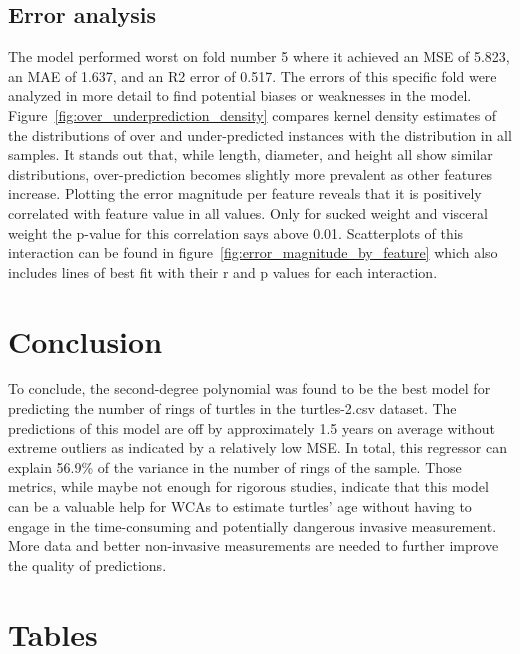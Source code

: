\documentclass[twocolumn]{article}
\begin{document}
\subsection{Error analysis}
The model performed worst on fold number 5 where it achieved an MSE of 5.823, an MAE of 1.637, and an R2 error of 0.517. The errors of this specific fold were analyzed in more detail to find potential biases or weaknesses in the model. Figure~\ref{fig:over_underprediction_density} compares kernel density estimates of the distributions of over and under-predicted instances with the distribution in all samples. It stands out that, while length, diameter, and height all show similar distributions, over-prediction becomes slightly more prevalent as other features increase.
Plotting the error magnitude per feature reveals that it is positively correlated with feature value in all values. Only for sucked weight and visceral weight the p-value for this correlation says above 0.01. Scatterplots of this interaction can be found in figure~\ref{fig:error_magnitude_by_feature} which also includes lines of best fit with their r and p values for each interaction.


\section{Conclusion}

To conclude, the second-degree polynomial was found to be the best model for predicting the number of rings of turtles in the turtles-2.csv dataset. The predictions of this model are off by approximately 1.5 years on average without extreme outliers as indicated by a relatively low MSE. In total, this regressor can explain 56.9\% of the variance in the number of rings of the sample. Those metrics, while maybe not enough for rigorous studies, indicate that this model can be a valuable help for WCAs to estimate turtles' age without having to engage in the time-consuming and potentially dangerous invasive measurement. More data and better non-invasive measurements are needed to further improve the quality of predictions.





\onecolumn
\appendix
\newpage

\section{Tables}
\renewcommand{\thetable}{A.\arabic{table}}
\setcounter{table}{0}
\end{document}
